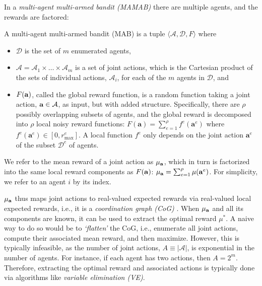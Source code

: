 \documentclass{article}
\def\hado#1{\textcolor{RubineRed}{\textbf{Hado: ``#1''}}}
\begin{document}
In a \emph{multi-agent multi-armed bandit (MAMAB)} there are multiple agents, and the rewards are factored:
\begin{definition}
A multi-agent multi-armed bandit (MAB) is a tuple $\langle \mathcal{A},\mathcal{D}, F\rangle$ where
\begin{itemize}
\item $\mathcal{D}$ is the set of $m$ enumerated agents,
\item $\mathcal{A} = \mathcal{A}_1 \times \dots \times \mathcal{A} _{m}$ is a set of joint actions, which is the Cartesian product of the sets of individual actions, $\mathcal{A}_i$, for each of the $m$ agents in $\mathcal{D}$, and
\item $F({\bf a})$, called the global reward function, is a random function taking a joint action, ${\bf a} \in \mathcal{A}$, as input, but with added structure.  Specifically, there are $\rho$ possibly overlapping subsets of agents, and the global reward is decomposed into $\rho$ local noisy reward functions: $F(\mathbf{a}) = \sum^\rho_{e=1} f^e(\mathbf{a}^e)$ where $f^e(\mathbf{a}^e) \in \left[0, r_{\max}^e\right]$. A local function $f^e$ only depends on the joint action $\mathbf{a}^e$ of the subset $\mathcal{D}^e$ of agents.
\end{itemize}
We refer to the mean reward of a joint action as $\mu_{\bf a}$, which in turn is factorized into the same local reward components as $F({\bf a})$: $\mu_{\bf a} = \sum^\rho_{e=1} \mu(\mathbf{a}^e)$. For simplicity, we refer to an agent $i$ by its index.
\end{definition}
$\mu_{\bf a}$ thus maps joint actions to real-valued expected rewards via real-valued local expected rewards, i.e., it is a \emph{coordination graph (CoG)} \cite{Guestrin02,KokVlassis06}. When $\mu_{\bf a}$ and all its components are known, it can be used to extract the optimal reward $\mu^*$. A naive way to do so would be to \emph{`flatten'} the CoG, i.e., enumerate all joint actions, compute their associated mean reward, and then maximize. However, this is typically infeasible, as the number of joint actions, $A \equiv |\mathcal{A}|$, is exponential in the number of agents. For instance, if each agent has two actions, then $A = 2^m$. Therefore, extracting the optimal reward and associated actions is typically done via algorithms like \emph{variable elimination (VE)}.
\end{document}
